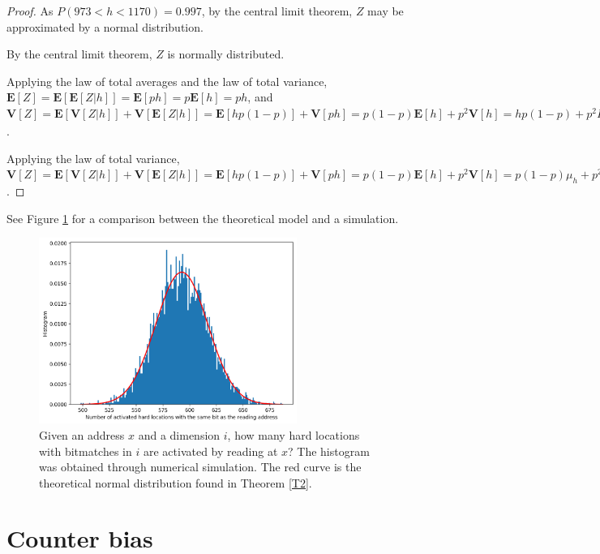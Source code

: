 \begin{proof}
As $P(973 < h < 1170) = 0.997$, by the central limit theorem, $Z$ may be approximated by a normal distribution.

By the central limit theorem, $Z$ is normally distributed.

Applying the law of total averages and the law of total variance, $\mathbf{E}[Z] = \mathbf{E}[\mathbf{E}[Z | h]] = \mathbf{E}[ph] = p \mathbf{E}[h] = ph$, and $\mathbf{V}[Z] = \mathbf{E}[\mathbf{V}[Z|h]] + \mathbf{V}[\mathbf{E}[Z|h]] = \mathbf{E}[hp(1-p)] + \mathbf{V}[ph] = p(1-p) \mathbf{E}[h] + p^2 \mathbf{V}[h] = hp(1-p) + p^2 H p_1 (1-p_1)$.

Applying the law of total variance, $\mathbf{V}[Z] = \mathbf{E}[\mathbf{V}[Z|h]] + \mathbf{V}[\mathbf{E}[Z|h]] = \mathbf{E}[hp(1-p)] + \mathbf{V}[ph] = p(1-p) \mathbf{E}[h] + p^2 \mathbf{V}[h] = p(1-p)\mu_h + p^2 \sigma^2_h$.
\end{proof}


See Figure \ref{fig:sdm-same-bit-histogram} for a comparison between the theoretical model and a simulation.

\begin{figure}[h!]
  \centering
  \includegraphics[width=0.75\textwidth]{./images02/autocorrelation/same-bit-histogram.png}

  \caption{Given an address $x$ and a dimension $i$, how many hard locations with bitmatches in $i$ are activated by reading at $x$?  The histogram was obtained through numerical simulation. The red curve is the theoretical normal distribution found in Theorem \ref{T2}.}
  \label{fig:sdm-same-bit-histogram}
\end{figure}

\section{Counter bias}

